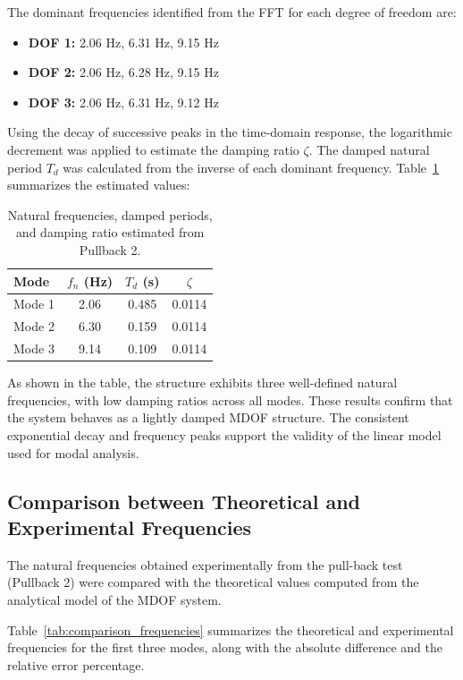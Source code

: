 \documentclass{article}  %
\begin{document}
The dominant frequencies identified from the FFT for each degree of freedom are:

\begin{itemize}
    \item \textbf{DOF 1:} 2.06 Hz, 6.31 Hz, 9.15 Hz
    \item \textbf{DOF 2:} 2.06 Hz, 6.28 Hz, 9.15 Hz
    \item \textbf{DOF 3:} 2.06 Hz, 6.31 Hz, 9.12 Hz
\end{itemize}

Using the decay of successive peaks in the time-domain response, the logarithmic decrement was applied to estimate the damping ratio $\zeta$. The damped natural period $T_d$ was calculated from the inverse of each dominant frequency. Table~\ref{tab:ld_results} summarizes the estimated values:

\begin{table}[H]
    \centering
    \begin{tabular}{lccc}
        \toprule
        \textbf{Mode} & $f_n$ (Hz) & $T_d$ (s) & $\zeta$ \\
        \midrule
        Mode 1 & 2.06 & 0.485 & 0.0114 \\
        Mode 2 & 6.30 & 0.159 & 0.0114 \\
        Mode 3 & 9.14 & 0.109 & 0.0114 \\
        \bottomrule
    \end{tabular}
    \caption{Natural frequencies, damped periods, and damping ratio estimated from Pullback 2.}
    \label{tab:ld_results}
\end{table}

As shown in the table, the structure exhibits three well-defined natural frequencies, with low damping ratios across all modes. These results confirm that the system behaves as a lightly damped MDOF structure. The consistent exponential decay and frequency peaks support the validity of the linear model used for modal analysis.

\subsection*{Comparison between Theoretical and Experimental Frequencies}

The natural frequencies obtained experimentally from the pull-back test (Pullback 2) were compared with the theoretical values computed from the analytical model of the MDOF system.

Table~\ref{tab:comparison_frequencies} summarizes the theoretical and experimental frequencies for the first three modes, along with the absolute difference and the relative error percentage.
\end{document}
